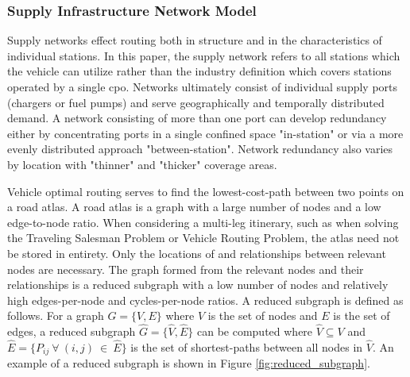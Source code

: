\documentclass[11pt]{article}
\begin{document}
\begin{multicols}{2}
\subsubsection*{Supply Infrastructure Network Model}

Supply networks effect routing both in structure and in the characteristics of individual stations. In this paper, the supply network refers to all stations which the vehicle can utilize rather than the industry definition which covers stations operated by a single \gls{cpo}. Networks ultimately consist of individual supply ports (chargers or fuel pumps) and serve geographically and temporally distributed demand. A network consisting of more than one port can develop redundancy either by concentrating ports in a single confined space "in-station" or via a more evenly distributed approach "between-station". Network redundancy also varies by location with "thinner" and "thicker" coverage areas.

Vehicle optimal routing serves to find the lowest-cost-path between two points on a road atlas. A road atlas is a graph with a large number of nodes and a low edge-to-node ratio. When considering a multi-leg itinerary, such as when solving the Traveling Salesman Problem or Vehicle Routing Problem, the atlas need not be stored in entirety. Only the locations of and relationships between relevant nodes are necessary. The graph formed from the relevant nodes and their relationships is a reduced subgraph with a low number of nodes and relatively high edges-per-node and cycles-per-node ratios. A reduced subgraph is defined as follows. For a graph $G = \{V, E\}$ where $V$ is the set of nodes and $E$ is the set of edges, a reduced subgraph $\hat{G} = \{\hat{V}, \hat{E}\}$ can be computed where $\hat{V} \subseteq V$ and $\hat{E} = \{P_{ij}\ \forall\ (i, j)\ \in\ \hat{E}\}$ is the set of shortest-paths between all nodes in $\hat{V}$. An example of a reduced subgraph is shown in Figure \ref{fig:reduced_subgraph}.


\end{multicols}
\end{document}
